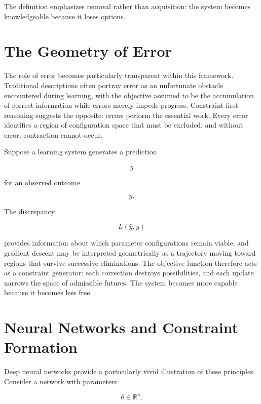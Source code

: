 \documentclass[11pt,oneside]{book}
\theoremstyle{plain}
\theoremstyle{definition}
\theoremstyle{remark}
\begin{document}
The definition emphasizes removal rather than acquisition: the system becomes knowledgeable because it loses options.

\section{The Geometry of Error}

The role of error becomes particularly transparent within this framework. Traditional descriptions often portray error as an unfortunate obstacle encountered during learning, with the objective assumed to be the accumulation of correct information while errors merely impede progress. Constraint-first reasoning suggests the opposite: errors perform the essential work. Every error identifies a region of configuration space that must be excluded, and without error, contraction cannot occur.

Suppose a learning system generates a prediction

\begin{equation}
\hat{y}
\end{equation}

for an observed outcome

\begin{equation}
y.
\end{equation}

The discrepancy

\begin{equation}
L(\hat{y},y)
\end{equation}

provides information about which parameter configurations remain viable, and gradient descent may be interpreted geometrically as a trajectory moving toward regions that survive successive eliminations. The objective function therefore acts as a constraint generator: each correction destroys possibilities, and each update narrows the space of admissible futures. The system becomes more capable because it becomes less free.

\section{Neural Networks and Constraint Formation}

Deep neural networks provide a particularly vivid illustration of these principles. Consider a network with parameters

\begin{equation}
\theta
\in
\mathbb{R}^n.
\end{equation}
\end{document}
